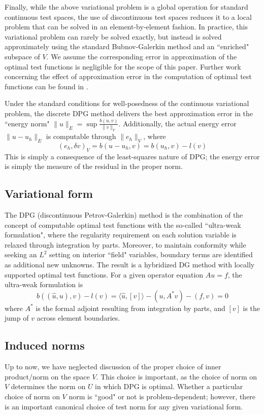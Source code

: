 \documentclass[11pt,onecolumn]{scrartcl}
\begin{document}
Finally, while the above variational problem is a global operation for standard continuous test spaces, the use of discontinuous test spaces reduces it to a local problem that can be solved in an element-by-element fashion.  In practice, this variational problem can rarely be solved exactly, but instead is solved approximately using the standard Bubnov-Galerkin method and an ``enriched" subspace of $V$. We assume the corresponding error in approximation of the optimal test functions is negligible for the scope of this paper.  Further work concerning the effect of approximation error in the computation of optimal test functions can be found in \cite{practicalDPG}.

Under the standard conditions for well-posedness of the continuous variational problem, the discrete DPG method delivers the best approximation error in the ``energy norm" $\|u\|_E = \sup \frac{b(u,v)}{\|v\|_V}$.  Additionally, the actual energy error $\|u-u_h\|_E$ is computable through $\|e_h\|_V$, where
\[
\left(e_h,\delta v\right)_V = b(u-u_h,v) = b(u_h,v)-l(v)
\]
This is simply a consequence of the least-squares nature of DPG; the energy error is simply the measure of the residual in the proper norm.  

\subsection{Variational form}

The DPG (discontinuous Petrov-Galerkin) method is the combination of the concept of computable optimal test functions with the so-called ``ultra-weak formulation", where the regularity requirement on each solution variable is relaxed through integration by parts.  Moreover, to maintain conformity while seeking an $L^2$ setting on interior ``field" variables, boundary terms are identified as additional new unknowns.  The result is a hybridized DG method with locally supported optimal test functions.  For a given operator equation $Au = f$, the ultra-weak formulation is 
\[
b\left(\left(\widehat{u},u\right),v\right) - l(v) = \langle \widehat{u}, [v] \rangle - (u,A^*v) - (f,v) = 0
\]
where $A^*$ is the formal adjoint resulting from integration by parts, and $[v]$ is the jump of $v$ across element boundaries.  

\subsection{Induced norms}

Up to now, we have neglected discussion of the proper choice of inner product/norm on the space $V$.  This choice is important, as the choice of norm on $V$ determines the norm on $U$ in which DPG is optimal. Whether a particular choice of norm on $V$ norm is ``good" or not is problem-dependent; however, there is an important canonical choice of test norm for any given variational form.  
\end{document}
